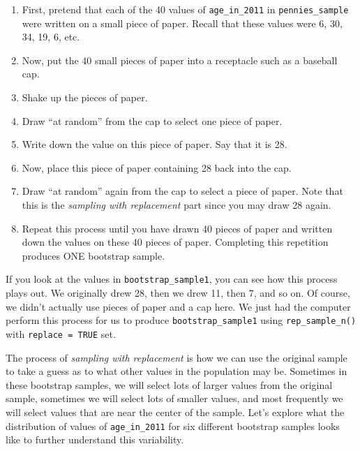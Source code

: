 \documentclass[12pt,]{krantz}
\makeatletter
\newenvironment{Shaded}{\begin{snugshade}}{\end{snugshade}}
\newcommand{\KeywordTok}[1]{\textcolor[rgb]{0.27,0.27,0.27}{\textbf{#1}}}
\newcommand{\DataTypeTok}[1]{\textcolor[rgb]{0.27,0.27,0.27}{#1}}
\newcommand{\DecValTok}[1]{\textcolor[rgb]{0.06,0.06,0.06}{#1}}
\newcommand{\StringTok}[1]{\textcolor[rgb]{0.5,0.5,0.5}{#1}}
\newcommand{\OtherTok}[1]{\textcolor[rgb]{0.37,0.37,0.37}{#1}}
\newcommand{\OperatorTok}[1]{\textcolor[rgb]{0.43,0.43,0.43}{\textbf{#1}}}
\newcommand{\NormalTok}[1]{#1}
\providecommand{\tightlist}{%
  \setlength{\itemsep}{0pt}\setlength{\parskip}{0pt}}
\newenvironment{kframe}{%
\medskip{}
\setlength{\fboxsep}{.8em}
 \def\at@end@of@kframe{}%
 \ifinner\ifhmode%
  \def\at@end@of@kframe{\end{minipage}}%
  \begin{minipage}{\columnwidth}%
 \fi\fi%
 \def\FrameCommand##1{\hskip\@totalleftmargin \hskip-\fboxsep
 \colorbox{shadecolor}{##1}\hskip-\fboxsep
     \hskip-\linewidth \hskip-\@totalleftmargin \hskip\columnwidth}%
 \MakeFramed {\advance\hsize-\width
   \@totalleftmargin\z@ \linewidth\hsize
   \@setminipage}}%
 {\par\unskip\endMakeFramed%
 \at@end@of@kframe}
\renewenvironment{Shaded}{\begin{kframe}}{\end{kframe}}
\makeatother
\begin{document}
\begin{enumerate}
\def\labelenumi{\arabic{enumi}.}
\tightlist
\item
  First, pretend that each of the 40 values of \texttt{age\_in\_2011} in
  \texttt{pennies\_sample} were written on a small piece of paper.
  Recall that these values were 6, 30, 34, 19, 6, etc.
\item
  Now, put the 40 small pieces of paper into a receptacle such as a
  baseball cap.
\item
  Shake up the pieces of paper.
\item
  Draw ``at random'' from the cap to select one piece of paper.
\item
  Write down the value on this piece of paper. Say that it is 28.
\item
  Now, place this piece of paper containing 28 back into the cap.
\item
  Draw ``at random'' again from the cap to select a piece of paper. Note
  that this is the \emph{sampling with replacement} part since you may
  draw 28 again.
\item
  Repeat this process until you have drawn 40 pieces of paper and
  written down the values on these 40 pieces of paper. Completing this
  repetition produces ONE bootstrap sample.
\end{enumerate}

If you look at the values in \texttt{bootstrap\_sample1}, you can see
how this process plays out. We originally drew 28, then we drew 11, then
7, and so on. Of course, we didn't actually use pieces of paper and a
cap here. We just had the computer perform this process for us to
produce \texttt{bootstrap\_sample1} using \texttt{rep\_sample\_n()} with
\texttt{replace\ =\ TRUE} set.

The process of \emph{sampling with replacement} is how we can use the
original sample to take a guess as to what other values in the
population may be. Sometimes in these bootstrap samples, we will select
lots of larger values from the original sample, sometimes we will select
lots of smaller values, and most frequently we will select values that
are near the center of the sample. Let's explore what the distribution
of values of \texttt{age\_in\_2011} for six different bootstrap samples
looks like to further understand this variability.

\begin{Shaded}
\end{Shaded}
\end{document}
